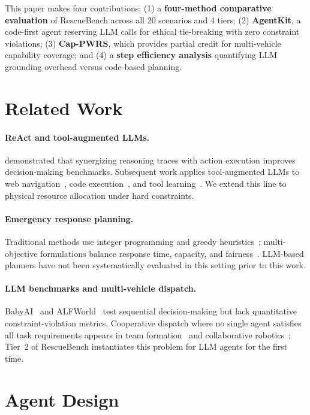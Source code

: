 \documentclass{article}
\begin{document}
This paper makes four contributions: (1) a \textbf{four-method comparative
evaluation} of RescueBench across all 20 scenarios and 4 tiers; (2)
\textbf{AgentKit}, a code-first agent reserving LLM calls for ethical
tie-breaking with zero constraint violations; (3) \textbf{Cap-PWRS}, which
provides partial credit for multi-vehicle capability coverage; and (4) a
\textbf{step efficiency analysis} quantifying LLM grounding overhead versus
code-based planning.

\section{Related Work}
\label{sec:related}

\paragraph{ReAct and tool-augmented LLMs.}
\citet{yao2023react} demonstrated that synergizing reasoning traces with action
execution improves decision-making benchmarks. Subsequent work applies
tool-augmented LLMs to web navigation~\citep{shinn2023reflexion}, code
execution~\citep{chen2022code}, and tool learning~\citep{schick2023toolformer}.
We extend this line to physical resource allocation under hard constraints.

\paragraph{Emergency response planning.}
Traditional methods use integer programming and greedy
heuristics~\citep{zhang2017ems}; multi-objective formulations balance response
time, capacity, and fairness~\citep{liu2019multi}. LLM-based planners have
not been systematically evaluated in this setting prior to this work.

\paragraph{LLM benchmarks and multi-vehicle dispatch.}
BabyAI~\citep{chevalier2019babyai} and ALFWorld~\citep{shridhar2021alfworld}
test sequential decision-making but lack quantitative constraint-violation
metrics. Cooperative dispatch where no single agent satisfies all task
requirements appears in team formation~\citep{stone2000} and collaborative
robotics~\citep{khamis2015}; Tier~2 of RescueBench instantiates this problem
for LLM agents for the first time.

\section{Agent Design}
\label{sec:agent}
\end{document}
